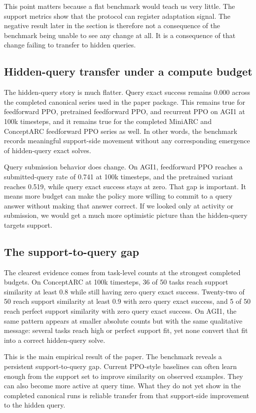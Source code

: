 This point matters because a flat benchmark would teach us very little. The support metrics show that the protocol can register adaptation signal. The negative result later in the section is therefore not a consequence of the benchmark being unable to see any change at all. It is a consequence of that change failing to transfer to hidden queries.

\subsection{Hidden-query transfer under a compute budget}

The hidden-query story is much flatter. Query exact success remains 0.000 across the completed canonical series used in the paper package. This remains true for feedforward PPO, pretrained feedforward PPO, and recurrent PPO on AGI1 at 100k timesteps, and it remains true for the completed MiniARC and ConceptARC feedforward PPO series as well. In other words, the benchmark records meaningful support-side movement without any corresponding emergence of hidden-query exact solves.

Query submission behavior does change. On AGI1, feedforward PPO reaches a submitted-query rate of 0.741 at 100k timesteps, and the pretrained variant reaches 0.519, while query exact success stays at zero. That gap is important. It means more budget can make the policy more willing to commit to a query answer without making that answer correct. If we looked only at activity or submission, we would get a much more optimistic picture than the hidden-query targets support.

\subsection{The support-to-query gap}

The clearest evidence comes from task-level counts at the strongest completed budgets. On ConceptARC at 100k timesteps, 36 of 50 tasks reach support similarity at least 0.8 while still having zero query exact success. Twenty-two of 50 reach support similarity at least 0.9 with zero query exact success, and 5 of 50 reach perfect support similarity with zero query exact success. On AGI1, the same pattern appears at smaller absolute counts but with the same qualitative message: several tasks reach high or perfect support fit, yet none convert that fit into a correct hidden-query solve.

This is the main empirical result of the paper. The benchmark reveals a persistent support-to-query gap. Current PPO-style baselines can often learn enough from the support set to improve similarity on observed examples. They can also become more active at query time. What they do not yet show in the completed canonical runs is reliable transfer from that support-side improvement to the hidden query.

